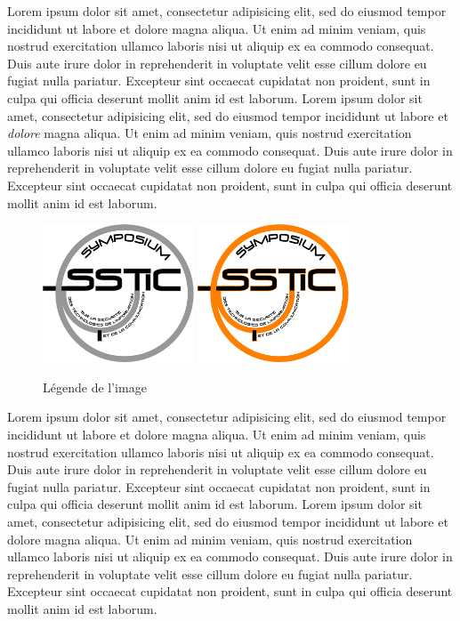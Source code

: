 Lorem ipsum dolor sit amet, consectetur adipisicing elit, sed do
eiusmod tempor incididunt ut labore et dolore magna aliqua. Ut enim ad
minim veniam, quis nostrud exercitation ullamco laboris nisi ut
aliquip ex ea commodo consequat. Duis aute irure dolor in
reprehenderit in voluptate velit esse cillum dolore eu fugiat nulla
pariatur. Excepteur sint occaecat cupidatat non proident, sunt in
culpa qui officia deserunt mollit anim id est laborum. Lorem ipsum
dolor sit amet, consectetur adipisicing elit, sed do eiusmod tempor
incididunt ut labore et \emph{dolore} magna aliqua. Ut enim ad minim
veniam, quis nostrud exercitation ullamco laboris nisi ut aliquip ex
ea commodo consequat. Duis aute irure dolor in reprehenderit in
voluptate velit esse cillum dolore eu fugiat nulla pariatur. Excepteur
sint occaecat cupidatat non proident, sunt in culpa qui officia
deserunt mollit anim id est laborum.


\begin{figure}[ht]
  \centering
  \ifssticbw
    \includegraphics[width=0.4\textwidth]{MonNom/img/bw-archi}
  \else
    \includegraphics[width=0.4\textwidth]{MonNom/img/archi}
  \fi
  \caption{Légende de l'image}
  \label{fig:monnom:archi}
\end{figure}

Lorem ipsum dolor sit amet, consectetur adipisicing elit, sed do
eiusmod tempor incididunt ut labore et dolore magna aliqua. Ut enim ad
minim veniam, quis nostrud exercitation ullamco laboris nisi ut
aliquip ex ea commodo consequat. Duis aute irure dolor in
reprehenderit in voluptate velit esse cillum dolore eu fugiat nulla
pariatur. Excepteur sint occaecat cupidatat non proident, sunt in
culpa qui officia deserunt mollit anim id est laborum. Lorem ipsum
dolor sit amet, consectetur adipisicing elit, sed do eiusmod tempor
incididunt ut labore et dolore magna aliqua. Ut enim ad minim veniam,
quis nostrud exercitation ullamco laboris nisi ut aliquip ex ea
commodo consequat. Duis aute irure dolor in reprehenderit in voluptate
velit esse cillum dolore eu fugiat nulla pariatur. Excepteur sint
occaecat cupidatat non proident, sunt in culpa qui officia deserunt
mollit anim id est laborum.


